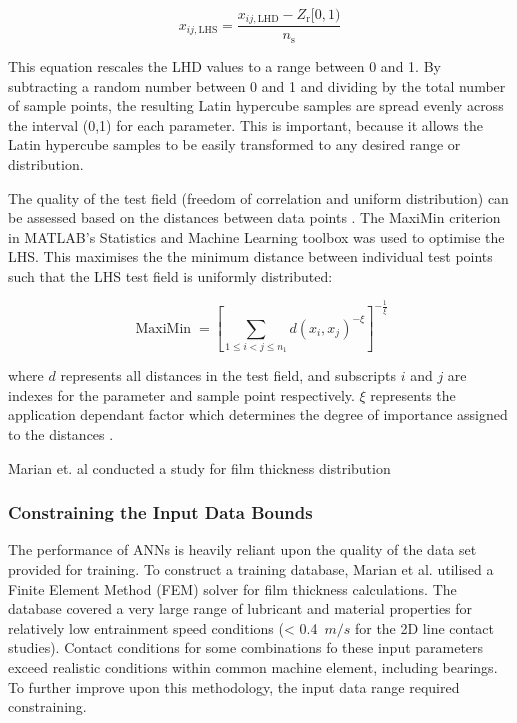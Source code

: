 \begin{equation}\label{LHS}
	x_{i j, \mathrm{LHS}}=\frac{x_{i j, \mathrm{LHD}}-Z_{\mathrm{r}}[0,1)}{n_{\mathrm{s}}}
\end{equation}

This equation rescales the LHD values to a range between 0 and 1. By subtracting a random number between 0 and 1 and dividing by the total number of sample points, the resulting Latin hypercube samples are spread evenly across the interval (0,1) for each parameter. This is important, because it allows the Latin hypercube samples to be easily transformed to any desired range or distribution.

The quality of the test field (freedom of correlation and uniform distribution) can be assessed based on the distances between data points \cite{Johnson1990}. The MaxiMin criterion in MATLAB's Statistics and Machine Learning toolbox was used to optimise the LHS. This maximises the the minimum distance between individual test points such that the LHS test field is uniformly distributed:

\begin{equation}\label{maximin}
	\operatorname{MaxiMin}=\left[\sum_{1 \leq i<j \leq n_1} d\left(x_i, x_j\right)^{-\xi}\right]^{-\frac{1}{\xi}}
\end{equation}

where $d$ represents all distances in the test field, and subscripts $i$ and $j$ are indexes for the parameter and sample point respectively. $\xi$ represents the application dependant factor which determines the degree of importance assigned to the distances \cite{Siebertz2010}.



Marian et. al conducted a study for film thickness distribution








\subsubsection{Constraining the Input Data Bounds}

The performance of ANNs is heavily reliant upon the quality of the data set provided for training. To construct a training database, Marian et al. \cite{Marian2022} utilised a Finite Element Method (FEM) solver for film thickness calculations. The database covered a very large range of lubricant and material properties for relatively low entrainment speed conditions (< 0.4~$m/s$ for the 2D line contact studies). Contact conditions for some combinations fo these input parameters exceed realistic conditions within common machine element, including bearings. To further improve upon this methodology, the input data range required constraining.

